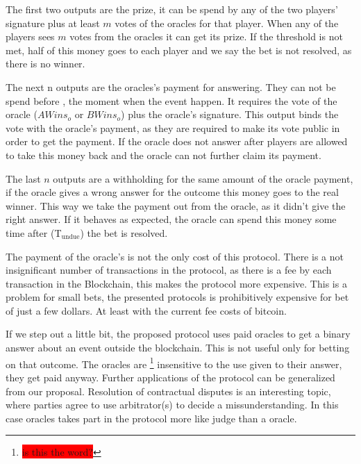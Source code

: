 The first two outputs are the prize, it can be spend by any of the two players'
  signature plus at least $m$ votes of the oracles for that player.
When any of the players sees $m$ votes from the oracles it can get its prize.
If the threshold is not met, half of this money goes to each player and we
  say the bet is not resolved, as there is no winner.

The next n outputs are the oracles's payment for answering.
They can not be spend before , the moment when the event happen.
It requires the vote of the oracle ($AWins_o$ or $BWins_o$) plus the oracle's
   signature.
This output binds the vote with the oracle's payment, as they are required to
  make its vote public in order to get the payment.
If the oracle does not answer after  players are allowed to
  take this money back and the oracle can not further claim its payment.

The last $n$ outputs are a withholding for the same amount of the oracle
  payment, if the oracle gives a wrong answer for the outcome this money
  goes to the real winner.
This way we take the payment out from the oracle, as it didn't give the right
  answer.
If it behaves as expected, the oracle can spend this money some time after
  (T$_{\text{undue}}$) the bet is resolved.



The payment of the oracle's is not the only cost of this protocol.
There is a not insignificant number of transactions in the protocol, as there
  is a fee by each transaction in the Blockchain, this makes the protocol more
  expensive.
This is a problem for small bets, the presented protocols is prohibitively
  expensive for bet of just a few dollars. At least with the current fee costs
  of bitcoin.

If we step out a little bit, the proposed protocol uses paid oracles to get a
  binary answer about an event outside the blockchain. This is not useful only
  for betting on that outcome. The oracles are \footnote{\colorbox{red}{
  is this the word?}} insensitive to the use given to their answer, they get
  paid anyway. Further applications of the protocol can be generalized from our
  proposal.
Resolution of contractual disputes is an interesting topic, where parties agree
  to use arbitrator(s) to decide a missunderstanding.
In this case oracles takes part in the protocol more like judge than a oracle.
